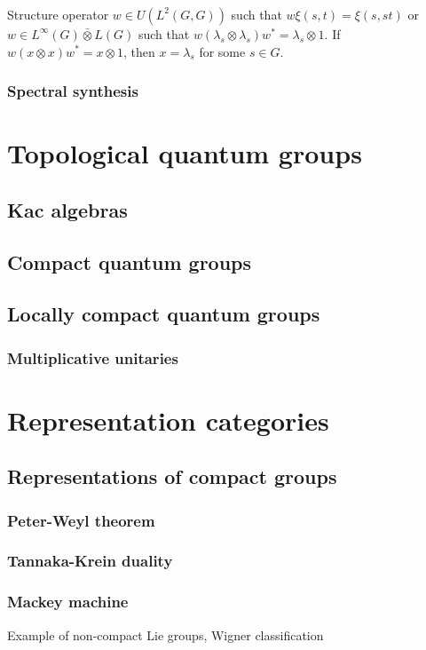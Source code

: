 \documentclass{../../large}
\begin{document}
\section{}

\begin{prb}
Structure operator $w\in U(L^2(G,G))$ such that $w\xi(s,t)=\xi(s,st)$ or $w\in L^\infty(G)\bar\otimes L(G)$ such that $w(\lambda_s\otimes\lambda_s)w^*=\lambda_s\otimes1$.
If $w(x\otimes x)w^*=x\otimes1$, then $x=\lambda_s$ for some $s\in G$.
\end{prb}



\section{Spectral synthesis}









\part{Topological quantum groups}



\chapter{Kac algebras}




\chapter{Compact quantum groups}


\chapter{Locally compact quantum groups}
\section{Multiplicative unitaries}


\part{Representation categories}


\chapter{Representations of compact groups}
\section{Peter-Weyl theorem}
\section{Tannaka-Krein duality}
\section{Mackey machine}
Example of non-compact Lie groups,
Wigner classification
\end{document}
